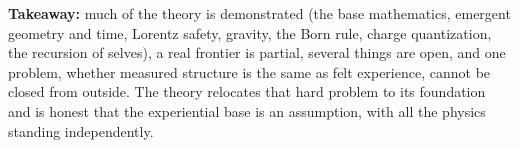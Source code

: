 \textbf{Takeaway:} much of the theory is demonstrated (the base mathematics, emergent geometry and time, Lorentz safety, gravity, the Born rule, charge quantization, the recursion of selves), a real frontier is partial, several things are open, and one problem, whether measured structure is the same as felt experience, cannot be closed from outside. The theory relocates that hard problem to its foundation and is honest that the experiential base is an assumption, with all the physics standing independently.
